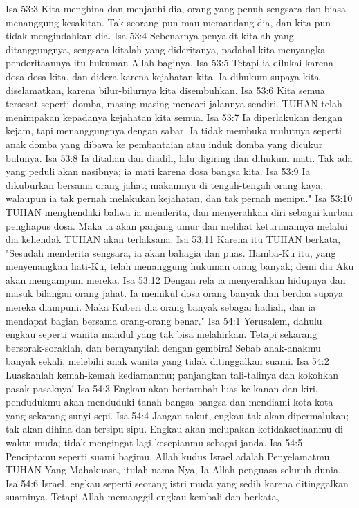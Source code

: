 Isa 53:3  Kita menghina dan menjauhi dia, orang yang penuh sengsara dan biasa menanggung kesakitan. Tak seorang pun mau memandang dia, dan kita pun tidak mengindahkan dia.
Isa 53:4  Sebenarnya penyakit kitalah yang ditanggungnya, sengsara kitalah yang dideritanya, padahal kita menyangka penderitaannya itu hukuman Allah baginya.
Isa 53:5  Tetapi ia dilukai karena dosa-dosa kita, dan didera karena kejahatan kita. Ia dihukum supaya kita diselamatkan, karena bilur-bilurnya kita disembuhkan.
Isa 53:6  Kita semua tersesat seperti domba, masing-masing mencari jalannya sendiri. TUHAN telah menimpakan kepadanya kejahatan kita semua.
Isa 53:7  Ia diperlakukan dengan kejam, tapi menanggungnya dengan sabar. Ia tidak membuka mulutnya seperti anak domba yang dibawa ke pembantaian atau induk domba yang dicukur bulunya.
Isa 53:8  Ia ditahan dan diadili, lalu digiring dan dihukum mati. Tak ada yang peduli akan nasibnya; ia mati karena dosa bangsa kita.
Isa 53:9  Ia dikuburkan bersama orang jahat; makamnya di tengah-tengah orang kaya, walaupun ia tak pernah melakukan kejahatan, dan tak pernah menipu."
Isa 53:10  TUHAN menghendaki bahwa ia menderita, dan menyerahkan diri sebagai kurban penghapus dosa. Maka ia akan panjang umur dan melihat keturunannya melalui dia kehendak TUHAN akan terlaksana.
Isa 53:11  Karena itu TUHAN berkata, "Sesudah menderita sengsara, ia akan bahagia dan puas. Hamba-Ku itu, yang menyenangkan hati-Ku, telah menanggung hukuman orang banyak; demi dia Aku akan mengampuni mereka.
Isa 53:12  Dengan rela ia menyerahkan hidupnya dan masuk bilangan orang jahat. Ia memikul dosa orang banyak dan berdoa supaya mereka diampuni. Maka Kuberi dia orang banyak sebagai hadiah, dan ia mendapat bagian bersama orang-orang benar."
Isa 54:1  Yerusalem, dahulu engkau seperti wanita mandul yang tak bisa melahirkan. Tetapi sekarang bersorak-soraklah, dan bernyanyilah dengan gembira! Sebab anak-anakmu banyak sekali, melebihi anak wanita yang tidak ditinggalkan suami.
Isa 54:2  Luaskanlah kemah-kemah kediamanmu; panjangkan tali-talinya dan kokohkan pasak-pasaknya!
Isa 54:3  Engkau akan bertambah luas ke kanan dan kiri, pendudukmu akan menduduki tanah bangsa-bangsa dan mendiami kota-kota yang sekarang sunyi sepi.
Isa 54:4  Jangan takut, engkau tak akan dipermalukan; tak akan dihina dan tersipu-sipu. Engkau akan melupakan ketidaksetiaanmu di waktu muda; tidak mengingat lagi kesepianmu sebagai janda.
Isa 54:5  Penciptamu seperti suami bagimu, Allah kudus Israel adalah Penyelamatmu. TUHAN Yang Mahakuasa, itulah nama-Nya, Ia Allah penguasa seluruh dunia.
Isa 54:6  Israel, engkau seperti seorang istri muda yang sedih karena ditinggalkan suaminya. Tetapi Allah memanggil engkau kembali dan berkata,
